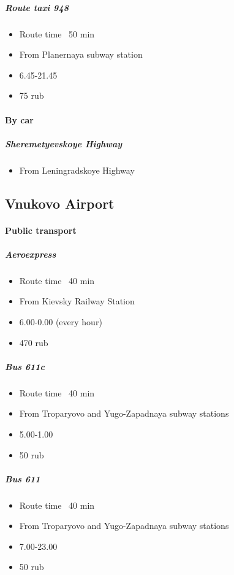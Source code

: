 \documentclass[10pt,fleqn,openany]{book} %
\begin{document}
\subparagraph{Route taxi 948}
\begin{itemize}
	\item Route time ~50 min
	\item From Planernaya subway station
	\item 6.45-21.45
	\item 75 rub
\end{itemize}

\paragraph{By car}
\subparagraph{Sheremetyevskoye Highway}
\begin{itemize}
	\item From Leningradskoye Highway
\end{itemize}

\subsection{Vnukovo Airport}
\paragraph{Public transport}

\subparagraph{Aeroexpress}
\begin{itemize}
	\item Route time ~40 min
	\item From Kievsky Railway Station
	\item 6.00-0.00 (every hour)
	\item 470 rub
\end{itemize}

\subparagraph{Bus 611c}
\begin{itemize}
	\item Route time ~40 min
	\item From Troparyovo and Yugo-Zapadnaya subway stations
	\item 5.00-1.00
	\item 50 rub
\end{itemize}

\subparagraph{Bus 611}
\begin{itemize}
	\item Route time ~40 min
	\item From Troparyovo and Yugo-Zapadnaya subway stations
	\item 7.00-23.00
	\item 50 rub
\end{itemize}
\end{document}
